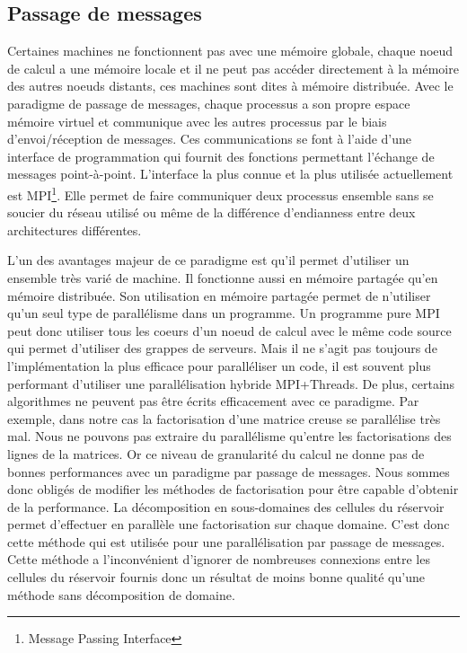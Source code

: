 \subsection{Passage de messages}
Certaines machines ne fonctionnent pas avec une mémoire globale, chaque noeud de calcul a une mémoire locale et il ne peut pas accéder directement à la mémoire des autres noeuds distants, ces machines sont dites à mémoire distribuée.
%
Avec le paradigme de passage de messages, chaque processus a son propre espace mémoire virtuel et communique avec les autres processus par le biais d'envoi/réception de messages.
%
Ces communications se font à l'aide d'une interface de programmation qui fournit des fonctions permettant l'échange de messages point-à-point.
%
L'interface la plus connue et la plus utilisée actuellement est MPI\footnote{Message Passing Interface}.
%
Elle permet de faire communiquer deux processus ensemble sans se soucier du réseau utilisé ou même de la différence d'endianness entre deux architectures différentes.


L'un des avantages majeur de ce paradigme est qu'il permet d'utiliser un ensemble très varié de machine.
%
Il fonctionne aussi en mémoire partagée qu'en mémoire distribuée.
%
Son utilisation en mémoire partagée permet de n'utiliser qu'un seul type de parallélisme dans un programme.
%
Un programme pure MPI peut donc utiliser tous les coeurs d'un noeud de calcul avec le même code source qui permet d'utiliser des grappes de serveurs.
%
Mais il ne s'agit pas toujours de l'implémentation la plus efficace pour paralléliser un code, il est souvent plus performant d'utiliser une parallélisation hybride MPI+Threads\cite{mpi_openmp}.
%
De plus, certains algorithmes ne peuvent pas être écrits efficacement avec ce paradigme.
%
Par exemple, dans notre cas la factorisation d'une matrice creuse se parallélise très mal.
%
Nous ne pouvons pas extraire du parallélisme qu'entre les factorisations des lignes de la matrices.
%
Or ce niveau de granularité du calcul ne donne pas de bonnes performances avec un paradigme par passage de messages.
%
Nous sommes donc obligés de modifier les méthodes de factorisation pour être capable d'obtenir de la performance.
%
La décomposition en sous-domaines des cellules du réservoir permet d'effectuer en parallèle une factorisation sur chaque domaine.
%
C'est donc cette méthode qui est utilisée pour une parallélisation par passage de messages.
%
Cette méthode a l'inconvénient d'ignorer de nombreuses connexions entre les cellules du réservoir fournis donc un résultat de moins bonne qualité qu'une méthode sans décomposition de domaine.
